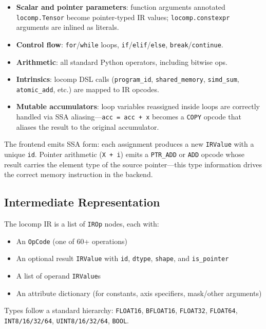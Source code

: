 \documentclass[10pt,twocolumn]{article}
\begin{document}
\begin{itemize}[noitemsep]
  \item \textbf{Scalar and pointer parameters}: function arguments annotated
    \texttt{locomp.Tensor} become pointer-typed IR values; \texttt{locomp.constexpr}
    arguments are inlined as literals.
  \item \textbf{Control flow}: \texttt{for}/\texttt{while} loops,
    \texttt{if}/\texttt{elif}/\texttt{else}, \texttt{break}/\texttt{continue}.
  \item \textbf{Arithmetic}: all standard Python operators, including bitwise ops.
  \item \textbf{Intrinsics}: locomp DSL calls (\texttt{program\_id},
    \texttt{shared\_memory}, \texttt{simd\_sum}, \texttt{atomic\_add}, etc.)
    are mapped to IR opcodes.
  \item \textbf{Mutable accumulators}: loop variables reassigned inside loops
    are correctly handled via SSA aliasing---\texttt{acc = acc + x} becomes
    a \texttt{COPY} opcode that aliases the result to the original accumulator.
\end{itemize}

The frontend emits SSA form: each assignment produces a new \texttt{IRValue}
with a unique \texttt{id}. Pointer arithmetic (\texttt{X + i}) emits a
\texttt{PTR\_ADD} or \texttt{ADD} opcode whose result carries the element type
of the source pointer---this type information drives the correct memory
instruction in the backend.

\subsection{Intermediate Representation}

The locomp IR is a list of \texttt{IROp} nodes, each with:
\begin{itemize}[noitemsep]
  \item An \texttt{OpCode} (one of 60+ operations)
  \item An optional result \texttt{IRValue} with \texttt{id}, \texttt{dtype},
        \texttt{shape}, and \texttt{is\_pointer}
  \item A list of operand \texttt{IRValue}s
  \item An attribute dictionary (for constants, axis specifiers, mask/other
        arguments)
\end{itemize}

Types follow a standard hierarchy: \texttt{FLOAT16}, \texttt{BFLOAT16},
\texttt{FLOAT32}, \texttt{FLOAT64}, \texttt{INT8/16/32/64},
\texttt{UINT8/16/32/64}, \texttt{BOOL}.
\end{document}
